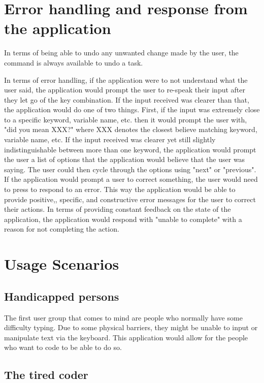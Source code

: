 \documentclass[11pt, oneside]{article}
\begin{document}
\section{Error handling and response from the application}

In terms of being able to undo any unwanted change made by the user, the command  is always available to undo a task.

In terms of error handling, if the application were to not understand what the user said, the application would prompt the user to re-speak their input after they let go of the key combination. If the input received was clearer than that, the application would do one of two things. First, if the input was extremely close to a specific keyword, variable name, etc. then it would prompt the user with, "did you mean XXX?" where XXX denotes the closest believe matching keyword, variable name, etc. If the input received was clearer yet still slightly indistinguishable between more than one keyword, the application would prompt the user a list of options that the application would believe that the user was saying. The user could then cycle through the options using "next" or "previous". If the application would prompt a user to correct something, the user would need to press  to respond to an error. This way the application would be able to provide positive,, specific, and constructive error messages for the user to correct their actions. In terms of providing constant feedback on the state of the application, the application would respond with "unable to complete" with a reason for not completing the action.


\section{Usage Scenarios}

\subsection{Handicapped persons}

The first user group that comes to mind are people who normally have some difficulty typing. Due to some physical barriers, they might be unable to input or manipulate text via the keyboard. This application would allow for the people who want to code to be able to do so. 

\subsection{The tired coder}
\end{document}
